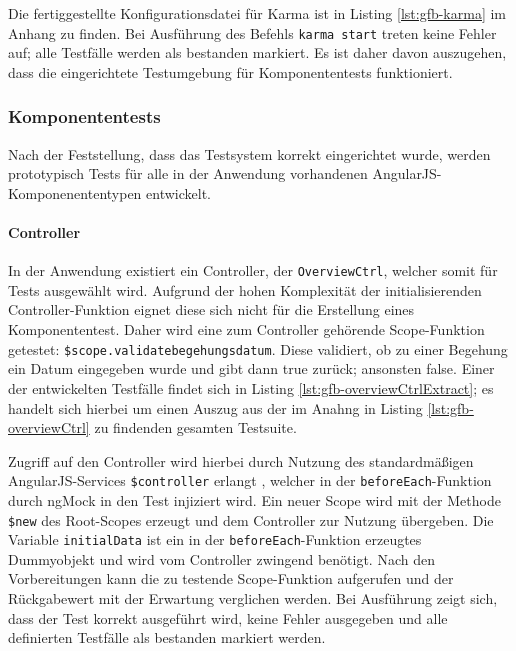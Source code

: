 Die fertiggestellte Konfigurationsdatei für Karma ist in Listing \ref{lst:gfb-karma} im Anhang zu finden. Bei Ausführung des Befehls \texttt{karma start} treten keine Fehler auf; alle Testfälle werden als bestanden markiert. Es ist daher davon auszugehen, dass die eingerichtete Testumgebung für Komponententests funktioniert. 	

\subsubsection{Komponententests}
Nach der Feststellung, dass das Testsystem korrekt eingerichtet wurde, werden prototypisch Tests für alle in der Anwendung vorhandenen AngularJS-Komponenententypen entwickelt.

\paragraph{Controller}
In der Anwendung existiert ein Controller, der \texttt{OverviewCtrl}, welcher somit für Tests ausgewählt wird. Aufgrund der hohen Komplexität der initialisierenden Controller-Funktion eignet diese sich nicht für die Erstellung eines Komponententest. Daher wird eine zum Controller gehörende Scope-Funktion getestet: \texttt{\$scope.validatebegehungsdatum}. Diese validiert, ob zu einer Begehung ein Datum eingegeben wurde und gibt dann true zurück; ansonsten false. Einer der entwickelten Testfälle findet sich in Listing \ref{lst:gfb-overviewCtrlExtract}; es handelt sich hierbei um einen Auszug aus der im Anahng in Listing \ref{lst:gfb-overviewCtrl} zu findenden gesamten Testsuite.

\begin{figure}[H]
	
\end{figure}

Zugriff auf den Controller wird hierbei durch Nutzung des standardmäßigen AngularJS-Services \texttt{\$controller} erlangt \cite{angular-controllerAPI}, welcher in der \texttt{beforeEach}-Funktion durch ngMock in den Test injiziert wird. Ein neuer Scope wird mit der Methode \texttt{\$new} des Root-Scopes erzeugt und dem Controller zur Nutzung übergeben. Die Variable \texttt{initialData} ist ein in der \texttt{beforeEach}-Funktion erzeugtes Dummyobjekt und wird vom Controller zwingend benötigt. Nach den Vorbereitungen kann die zu testende Scope-Funktion aufgerufen und der Rückgabewert mit der Erwartung verglichen werden. Bei Ausführung zeigt sich, dass der Test korrekt ausgeführt wird, keine Fehler ausgegeben und alle definierten Testfälle als bestanden markiert werden.

